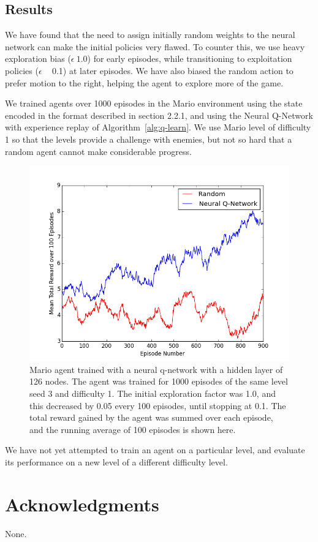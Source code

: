 \documentclass{article}
\begin{document}
 \subsection{Results}
 
We have found that the need to assign initially random weights to the neural network can make the initial policies very flawed. To counter this, we use heavy exploration bias ($\epsilon ~ 1.0$) for early episodes, while transitioning to exploitation policies ($\epsilon$ ~ 0.1) at later episodes. We have also biased the random action to prefer motion to the right, helping the agent to explore more of the game.
 
We trained agents over 1000 episodes in the Mario environment using the state encoded in the format described in section 2.2.1, and using the Neural Q-Network with experience replay of Algorithm~\ref{alg:q-learn}. We use Mario level of difficulty 1 so that the levels provide a challenge with enemies, but not so hard that a random agent cannot make considerable progress.
 
 \begin{figure}
 \begin{center}
\includegraphics[scale=0.42]{progress_report.png}
\caption{Mario agent trained with a neural q-network with a hidden layer of 126 nodes. The agent was trained for 1000 episodes of the same level seed 3 and difficulty 1. The initial exploration factor was 1.0, and this decreased by 0.05 every 100 episodes, until stopping at 0.1. The total reward gained by the agent was summed over each episode, and the running average of 100 episodes is shown here.}
\end{center}
\end{figure}
 
We have not yet attempted to train an agent on a particular level, and evaluate its performance on a new level of a different difficulty level.
 
\section*{Acknowledgments} 
 
None.



\end{document}
